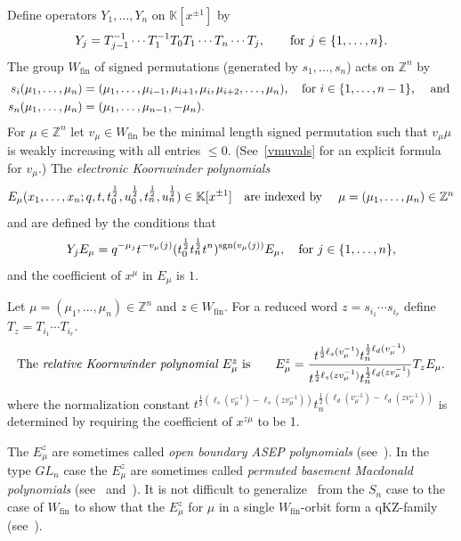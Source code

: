 \documentclass[11pt]{article}
\theoremstyle{plain}
\theoremstyle{definition}
\theoremstyle{remark}
\numberwithin{equation}{section}
\def\KK{\mathbb{K}}
\def\ZZ{\mathbb{Z}}
\newcounter{r}
\newcounter{s}
\begin{document}
Define operators $Y_1, \ldots, Y_n$ on $\KK[x^{\pm1}]$ by
\begin{equation}
Y_j = T_{j-1}^{-1}\cdots T_1^{-1}T_0T_1\cdots T_n\cdots T_j,
\qquad\hbox{for $j\in \{1, \ldots, n\}$.}
\label{Yjdefn}
\end{equation}
The group $W_{\mathrm{fin}}$ of signed permutations (generated by $s_1, \ldots, s_n$)
acts on $\ZZ^n$ by 
\begin{align*}
s_i(\mu_1, \ldots, \mu_n) &= (\mu_1, \ldots, \mu_{i-1}, \mu_{i+1}, \mu_i, \mu_{i+2}, \ldots, \mu_n), 
\quad\hbox{for $i\in \{1, \ldots, n-1\}$, \quad and } \\
s_n(\mu_1, \ldots, \mu_n) &= (\mu_1, \ldots, \mu_{n-1}, -\mu_n).
\end{align*}
For $\mu\in \ZZ^n$ let $v_\mu\in W_{\mathrm{fin}}$ be the minimal length signed permutation such that $v_\mu \mu$ is weakly increasing
with all entries $\le 0$.
(See~\eqref{vmuvals} for an explicit formula for $v_\mu$.)
The \emph{electronic Koornwinder polynomials}
$$E_\mu(x_1,\ldots, x_n;q,t, t_0^{\frac12}, u_0^{\frac12}, t_n^{\frac12}, u_n^{\frac12})
\in \KK[x^{\pm1}]
\quad\hbox{are indexed by $\quad \mu=(\mu_1, \ldots, \mu_n)\in \ZZ^n$}
$$
and are defined by the conditions that 
\begin{equation}
Y_j E_\mu = q^{-\mu_j}t^{-v_\mu(j)} (t^{\frac12}_0t^{\frac12}_n t^n)^{\mathrm{sgn}(v_\mu(j))}
E_\mu, \quad \hbox{for $j\in \{1, \ldots, n\}$,}
\label{Eeig}
\end{equation}
and the coefficient of $x^{\mu}$ in $E_\mu$ is $1$.  


Let $\mu = (\mu_1, \ldots, \mu_n)\in \ZZ^n$ and $z\in W_{\mathrm{fin}}$.  For a reduced word
$z = s_{i_1}\cdots s_{i_r}$ define $T_z = T_{i_1}\cdots T_{i_r}$.
\begin{equation}
\hbox{The \emph{relative Koornwinder polynomial $E^z_\mu$} is} \qquad
E^z_\mu = 
\frac{t^{\frac12\ell_s(v_\mu^{-1})}t_n^{\frac12\ell_d(v_\mu^{-1})}  }{ t^{\frac12\ell_s(zv_\mu^{-1}) }t_n^{\frac12\ell_d(zv_\mu^{-1})}  } 
T_z E_\mu.
\label{relMac}
\end{equation}
where the normalization constant 
$t^{\frac12(\ell_s(v_\mu^{-1})-\ell_s(zv_\mu^{-1}))}t_n^{\frac12(\ell_d(v_\mu^{-1})-\ell_d(zv_\mu^{-1}))}$ 
is determined by requiring the coefficient of $x^{z\mu}$ to be 1.

The $E^z_\mu$ are sometimes called \emph{open boundary ASEP polynomials} (see~\cite[Theorem 1.10 and Remark 1.13]{CMW23}).
In the type $GL_n$ case the $E^z_\mu$ are sometimes called \emph{permuted basement Macdonald polynomials} (see~\cite{Al16} and~\cite[(3.7)]{GR21}).
It is not difficult to generalize~\cite[Proposition 1.2]{GR21b} from the $S_n$ case to the case of $W_{\mathrm{fin}}$
to show that the $E^z_\mu$ for $\mu$ in a single $W_{\mathrm{fin}}$-orbit form a qKZ-family (see~\cite[Def.\ 2.4 and Prop.\ 2.6]{CMW23}).
\end{document}
